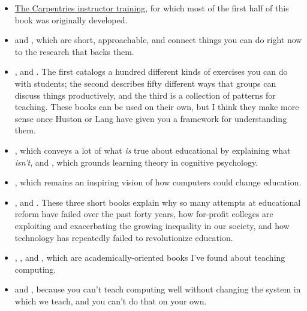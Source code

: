\begin{itemize}

  \item \href{http://carpentries.github.io/instructor-training/}{The
    Carpentries instructor training}, for which most of the first half
    of this book was originally developed.

  \item \cite{Lang2016} and \cite{Hust2012}, which are short,
    approachable, and connect things you can do right now to the
    research that backs them.

  \item \cite{Majo2015}, \cite{Broo2016} and \cite{Berg2012}.  The
    first catalogs a hundred different kinds of exercises you can do
    with students; the second describes fifty different ways that
    groups can discuss things productively, and the third is a
    collection of patterns for teaching.  These books can be used on
    their own, but I think they make more sense once Huston or Lang
    have given you a framework for understanding them.

  \item \cite{DeBr2015}, which conveys a lot of what \emph{is} true
    about educational by explaining what \emph{isn't}, and
    \cite{Dida2016}, which grounds learning theory in cognitive
    psychology.

  \item \cite{Pape1993}, which remains an inspiring vision of how
    computers could change education.

  \item \cite{Gree2014}, \cite{McMi2017} and \cite{Watt2014}.  These
    three short books explain why so many attempts at educational
    reform have failed over the past forty years, how for-profit
    colleges are exploiting and exacerbating the growing inequality in
    our society, and how technology has repeatedly failed to
    revolutionize education.

  \item \cite{Guzd2015a}, \cite{Hazz2014}, and \cite{Sent2018}, which
    are academically-oriented books I've found about teaching
    computing.

  \item \cite{Brow2007} and \cite{Mann2015}, because you can't teach
    computing well without changing the system in which we teach, and
    you can't do that on your own.

\end{itemize}

